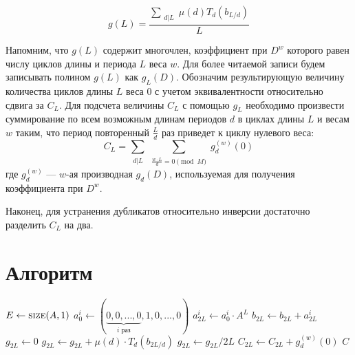\[
  g(L) = \frac{\sum_{\substack{d|L}}\mu(d)T_d(b_{L/d})}{L}
\]

Напомним, что $g(L)$ содержит многочлен, коэффициент при $D^w$ которого равен числу циклов длины и периода $L$ веса $w$. Для более читаемой записи будем записывать полином $g(L)$ как $g_L(D)$.
Обозначим результирующую величину количества циклов длины $L$ веса 0 с учетом эквивалентности относительно сдвига за $C_L$.
Для подсчета величины $C_L$ с помощью $g_L$ необходимо произвести суммирование по всем возможным длинам периодов $d$ в циклах
длины $L$ и весам $w$ таким, что период повторенный $\frac{L}{d}$ раз приведет к циклу нулевого веса:
\[
  C_L=\sum_{\substack{d|L}}\sum_{\substack{\frac{w \cdot L}{d} = 0 \pmod{M}}}g^{(w)}_d(0)
\]
где $g^{(w)}_d$ --- $w$-ая производная $g_d(D)$, используемая для получения коэффициента при $D^w$.

Наконец, для устранения дубликатов относительно инверсии достаточно разделить $C_L$ на два.

\section{Алгоритм}

\renewcommand{\algorithmicrequire}{\textbf{Вход:}}
\renewcommand{\algorithmicensure}{\textbf{Результат:}}
\begin{algorithm}[!h]
\begin{algorithmic}[1]
		\State $E \gets \textsc{size}(A,1)$
			\For{$i \gets [0; E)$}
				\State $a_0^i \gets (\underbrace{0,0,...,0}_{i \text{ раз}},1,0,...,0)$
				\State $a_{2L}^i \gets a_0^i \cdot A^L$ \label{aeq2}
				\State $b_{2L} \gets b_{2L} + a_{2L}^i$ \label{aeq3}
			\EndFor
			\State $g_{2L} \gets 0$
				\State $g_{2L} \gets g_{2L} + \mu(d) \cdot T_d(b_{2L/d})$
			\EndFor
			\State $g_{2L} \gets g_{2L} / 2L$
				\For{$w \gets [0; M)$, $\frac{w \cdot 2L}{d}=0\pmod{M}$}
					\State $C_{2L} \gets C_{2L} + g^{(w)}_d(0)$ \label{aeq5}
				\EndFor
			\EndFor
		\EndFor
		\State\Return $C$
	\EndFunction	
\end{algorithmic}
\end{algorithm}

